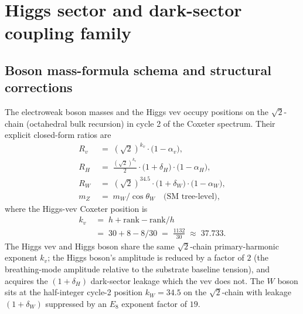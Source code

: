 ﻿\documentclass[reprint,amsmath,amssymb,aps,prd,longbibliography,floatfix]{revtex4-2}
\begin{document}
\section{Higgs sector and dark-sector coupling family}
\label{sec:higgs}

\subsection{Boson mass-formula schema and structural corrections}

The electroweak boson masses and the Higgs vev occupy positions on
the $\sqrt{2}$-chain (octahedral bulk recursion) in cycle 2 of the
Coxeter spectrum. Their explicit closed-form ratios are
\begin{align}
R_v \;&=\; (\sqrt{2})^{k_v} \cdot \bigl(1 - \alpha_v\bigr),
   \label{eq:Rv} \\
R_H \;&=\; \frac{(\sqrt{2})^{k_v}}{2} \cdot \bigl(1 + \delta_H\bigr) \cdot \bigl(1 - \alpha_H\bigr),
   \label{eq:RH} \\
R_W \;&=\; (\sqrt{2})^{34.5} \cdot \bigl(1 + \delta_W\bigr) \cdot \bigl(1 - \alpha_W\bigr),
   \label{eq:RW} \\
m_Z \;&=\; m_W / \cos\theta_W
\quad \text{(SM tree-level)},
   \label{eq:mZ-deriv}
\end{align}
where the Higgs-vev Coxeter position is
\begin{equation}
\begin{aligned}
k_v \;&=\; h + \text{rank} - \text{rank}/h \\
     \;&=\; 30 + 8 - 8/30 \;=\; \frac{1132}{30} \;\approx\; 37.733.
\end{aligned}
\label{eq:kv-derived}
\end{equation}
The Higgs vev and Higgs boson share the same $\sqrt{2}$-chain
primary-harmonic exponent $k_v$; the Higgs boson's amplitude is
reduced by a factor of $2$ (the breathing-mode amplitude relative to
the substrate baseline tension), and acquires the $(1 + \delta_H)$
dark-sector leakage which the vev does not. The $W$ boson sits at
the half-integer cycle-2 position $k_W = 34.5$ on the
$\sqrt{2}$-chain with leakage $(1 + \delta_W)$ suppressed by an
$E_8$ exponent factor of $19$.
\end{document}
